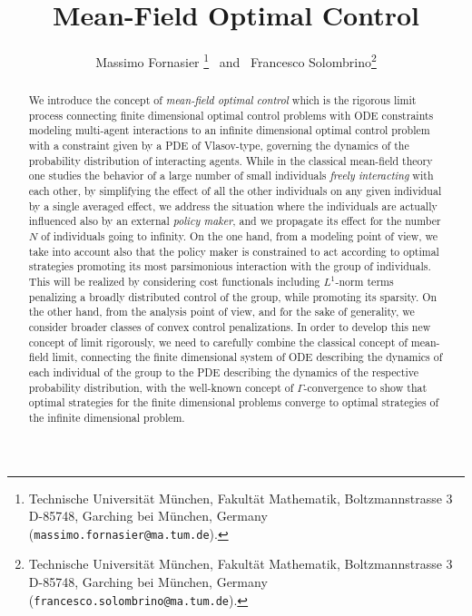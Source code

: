 \documentclass[11pt]{article}
\theoremstyle{plain}
\theoremstyle{definition}
\theoremstyle{remark}
\numberwithin{equation}{section}
\begin{document}
\title{Mean-Field Optimal Control}
\author{
Massimo Fornasier
\footnote{Technische Universit\"at M\"unchen, Fakult\"at Mathematik, Boltzmannstrasse 3
 D-85748, Garching bei M\"unchen, Germany  ({\tt massimo.fornasier@ma.tum.de}). } \, and \,
Francesco Solombrino\footnote{Technische Universit\"at M\"unchen, Fakult\"at Mathematik, Boltzmannstrasse 3
D-85748, Garching bei M\"unchen, Germany  ({\tt francesco.solombrino@ma.tum.de}).}
}
\maketitle

\begin{abstract}
We introduce the concept of {\it mean-field optimal control} which is the rigorous limit process connecting finite
dimensional optimal control problems with ODE constraints modeling multi-agent interactions to an infinite dimensional optimal control problem 
with a constraint given by a PDE of Vlasov-type, governing the dynamics of the probability distribution of interacting agents.
While in the classical mean-field theory one studies the behavior of a large number of small individuals {\it freely interacting} with each other, by 
simplifying the effect of all the other individuals on any given individual by a single averaged effect, we address the situation where the individuals
are actually influenced also by an external {\it policy maker}, and we propagate its effect for the number $N$ of individuals going to infinity. 
On the one hand, from a modeling point of view, we take into account also that the policy maker is constrained to act according to optimal strategies promoting its most parsimonious interaction with 
the group of individuals. This will be realized by considering cost functionals including $L^1$-norm terms penalizing a broadly distributed control
of the group, while promoting its sparsity.  On the other hand, from the analysis point of view, and for the sake of generality, we consider broader classes of convex control penalizations. In order 
to develop this new concept of limit rigorously, we need to carefully combine the classical concept of mean-field limit,
connecting the finite dimensional system of ODE describing the dynamics of each individual of the group to the PDE describing the dynamics of the respective
probability distribution, with the well-known concept of $\Gamma$-convergence to show that optimal strategies for the finite dimensional problems
converge to optimal strategies of the infinite dimensional problem. 
\end{abstract}
\end{document}
